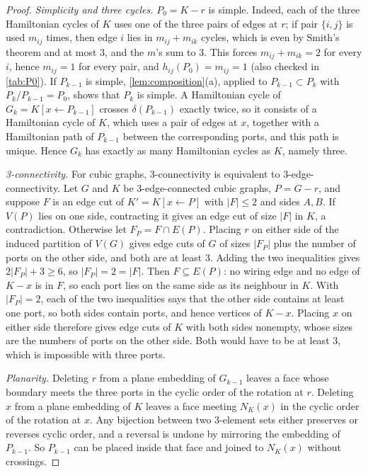 \documentclass[11pt]{article}
\theoremstyle{definition}
\begin{document}
\begin{proof}
\emph{Simplicity and three cycles.} $P_0 = K - r$ is simple. Indeed, each of the three
Hamiltonian cycles of $K$ uses one of the three pairs of edges at $r$; if pair $\{i,j\}$ is used
$m_{ij}$ times, then edge $i$ lies in $m_{ij} + m_{ik}$ cycles, which is even by Smith's theorem
and at most $3$, and the $m$'s sum to $3$. This forces $m_{ij} + m_{ik} = 2$ for every $i$, hence
$m_{ij} = 1$ for every pair, and $h_{ij}(P_0) = m_{ij} = 1$ (also checked in \cref{tab:P0}). If
$P_{k-1}$ is simple, \cref{lem:composition}(a), applied to $P_{k-1} \subset P_k$ with
$P_k / P_{k-1} = P_0$, shows that $P_k$ is simple. A Hamiltonian cycle of
$G_k = K[x \leftarrow P_{k-1}]$ crosses $\delta(P_{k-1})$ exactly twice, so it consists of a
Hamiltonian cycle of $K$, which uses a pair of edges at $x$, together with a Hamiltonian path of
$P_{k-1}$ between the corresponding ports, and this path is unique. Hence $G_k$ has exactly as
many Hamiltonian cycles as $K$, namely three.

\emph{3-connectivity.} For cubic graphs, 3-connectivity is equivalent to 3-edge-connectivity. Let
$G$ and $K$ be 3-edge-connected cubic graphs, $P = G - r$, and suppose $F$ is an edge cut of
$K' = K[x \leftarrow P]$ with $|F| \le 2$ and sides $A, B$. If $V(P)$ lies on one side, contracting
it gives an edge cut of size $|F|$ in $K$, a contradiction. Otherwise let $F_P = F \cap E(P)$.
Placing $r$ on either side of the induced partition of $V(G)$ gives edge cuts of $G$ of sizes
$|F_P|$ plus the number of ports on the other side, and both are at least $3$. Adding the two
inequalities gives $2|F_P| + 3 \ge 6$, so $|F_P| = 2 = |F|$. Then $F \subseteq E(P)$: no wiring
edge and no edge of $K - x$ is in $F$, so each port lies on the same side as its neighbour in $K$.
With $|F_P| = 2$, each of the two inequalities says that the other side contains at least one
port, so both sides contain ports, and hence vertices of $K - x$. Placing $x$ on either side
therefore gives edge cuts of $K$ with both sides nonempty, whose sizes are the numbers of ports on
the other side. Both would have to be at least $3$, which is impossible with three ports.

\emph{Planarity.} Deleting $r$ from a plane embedding of $G_{k-1}$ leaves a face whose boundary
meets the three ports in the cyclic order of the rotation at $r$. Deleting $x$ from a plane
embedding of $K$ leaves a face meeting $N_K(x)$ in the cyclic order of the rotation at $x$. Any
bijection between two 3-element sets either preserves or reverses cyclic order, and a reversal is
undone by mirroring the embedding of $P_{k-1}$. So $P_{k-1}$ can be placed inside that face and
joined to $N_K(x)$ without crossings.
\end{proof}
\end{document}
